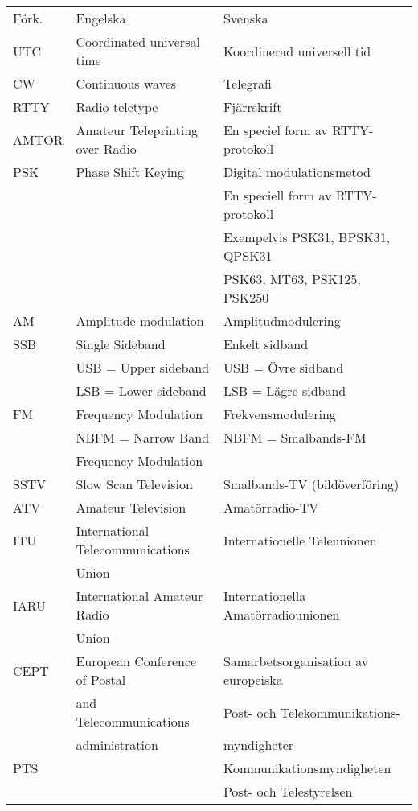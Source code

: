 \begin{table*}[h]
  \begin{tabular}{lll}
    Förk. & Engelska & Svenska\\
    UTC & Coordinated universal time & Koordinerad universell tid\\
    CW & Continuous waves & Telegrafi\\
    RTTY & Radio teletype & Fjärrskrift\\
    AMTOR & Amateur Teleprinting over Radio & En speciel form av
    RTTY-protokoll\\
    PSK & Phase Shift Keying & Digital modulationsmetod\\
    && En speciell form av RTTY-protokoll\\
    && Exempelvis PSK31, BPSK31, QPSK31\\
    && PSK63, MT63, PSK125, PSK250\\
    AM & Amplitude modulation & Amplitudmodulering\\
    SSB & Single Sideband & Enkelt sidband\\
    & USB = Upper sideband & USB = Övre sidband\\
    & LSB = Lower sideband & LSB = Lägre sidband\\
    FM & Frequency Modulation & Frekvensmodulering\\
    & NBFM = Narrow Band & NBFM = Smalbands-FM\\
    & Frequency Modulation & \\
    SSTV & Slow Scan Television & Smalbands-TV (bildöverföring)\\
    ATV & Amateur Television & Amatörradio-TV\\
    ITU & International Telecommunications & Internationelle
    Teleunionen\\
    & Union & \\
    IARU & International Amateur Radio & Internationella
    Amatörradiounionen\\
    & Union &\\
    CEPT & European Conference of Postal & Samarbetsorganisation av europeiska\\
    & and Telecommunications & Post- och Telekommunikations-\\
    & administration & myndigheter\\
    PTS & & Kommunikationsmyndigheten\\
    && Post- och Telestyrelsen\\
  \end{tabular}
\end{table*}

